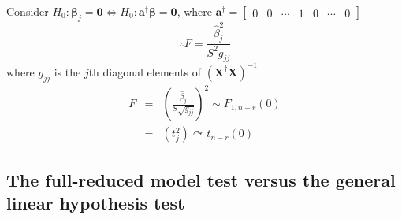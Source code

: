 \documentclass{article}
\begin{document}
\bigskip

Consider $H_{0}:\mathbf{\beta }_{j}\mathbf{=0}\Leftrightarrow H_{0}:\mathbf{a%
}^{\dagger }\mathbf{\beta =0}$, where $\mathbf{a}^{\dagger }=\left[ 
\begin{array}{ccccccc}
0 & 0 & \cdots & 1 & 0 & \cdots & 0%
\end{array}%
\right] $%
\begin{equation*}
\therefore F=\frac{\hat{\beta}_{j}^{2}}{S^{2}g_{jj}}
\end{equation*}%
where $g_{jj}$ is the $j$th diagonal elements of $\left( \mathbf{X}^{\dagger
}\mathbf{X}\right) ^{-1}$%
\begin{eqnarray*}
F &=&\left( \frac{\hat{\beta}_{j}}{S\sqrt{g_{jj}}}\right) ^{2}\sim
F_{1,n-r}\left( 0\right) \\
&=&\left( t_{j}^{2}\right) \curvearrowright t_{n-r}\left( 0\right)
\end{eqnarray*}

\bigskip

\bigskip

\subsection{The full-reduced model test versus the general linear hypothesis
test}
\end{document}
